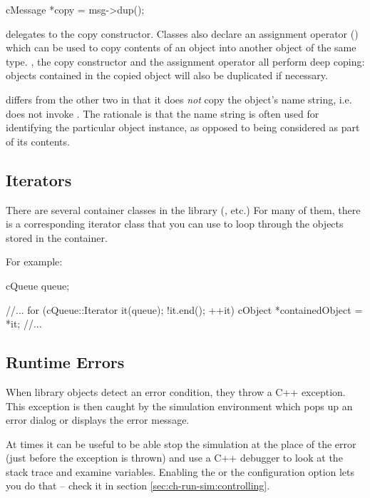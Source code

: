 \begin{cpp}
cMessage *copy = msg->dup();
\end{cpp}

 delegates to the copy constructor. Classes also declare
an assignment operator () which can be used to copy contents
of an object into another object of the same type. , the copy
constructor and the assignment operator all perform deep coping: objects
contained in the copied object will also be duplicated if necessary.

 differs from the other two in that it does \textit{not}
copy the object's name string, i.e. does not invoke .
The rationale is that the name string is often used for identifying the particular
object instance, as opposed to being considered as part of its contents.


\subsection{Iterators}

There are several container classes in the library (,
 etc.) For many of them, there is a corresponding
iterator class that you can use to loop through the objects stored in
the container.

For example:

\begin{cpp}
cQueue queue;

//...
for (cQueue::Iterator it(queue); !it.end(); ++it) {
    cObject *containedObject = *it;
    //...
}
\end{cpp}

\subsection{Runtime Errors}

When library objects detect an error condition, they throw a C++ exception.
This exception is then caught by the simulation environment which pops up
an error dialog or displays the error message.

At times it can be useful to be able stop the simulation at the place of
the error (just before the exception is thrown) and use a C++ debugger to
look at the stack trace and examine variables. Enabling the
 or the 
configuration option lets you do that -- check it in section
\ref{sec:ch-run-sim:controlling}.


